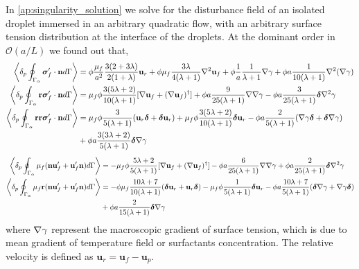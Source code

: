 In \ref{ap:singularity_solution} we solve for the disturbance field of an isolated droplet immersed in an arbitrary quadratic flow, with an arbitrary surface tension distribution at the interface of the droplets. 
At the dominant order in $\mathcal{O}(a/L)$ we found out that, 
\begin{align}
    \pSavg{\bm\sigma_f'\cdot \textbf{n}} &
    =
    \phi
    \frac{\mu_f}{a^2}
    \frac{3(2+3\lambda)}{2(1+\lambda)}\textbf{u}_r
    + \phi\mu_f  \frac{3\lambda}{4(\lambda +1)} \grad^2 \textbf{u}_f
    + \phi \frac{1}{a}\frac{1}{\lambda +1} \grad \gamma
    + \phi a \frac{1}{10(\lambda +1)}\grad^2(\grad\gamma)
    \label{eq:drag_forces}
    \\
    \pSavg{\textbf{r}\bm\sigma_f'\cdot \textbf{n}} &
    = \mu_f \phi 
    \frac{3(5\lambda +2)}{10(\lambda +1)}[\grad \textbf{u}_f+ (\grad \textbf{u}_f)^\dagger]
    + \phi a \frac{9}{25(\lambda +1)}\grad\grad \gamma
    - \phi a \frac{3}{25(\lambda +1)}\bm\delta\grad^2 \gamma
    \\
    \pSavg{\textbf{rr}\bm\sigma_f'\cdot \textbf{n}} &
    =
    \mu_f \phi \frac{3}{5(\lambda +1)} (\textbf{u}_r \bm\delta + \bm\delta \textbf{u}_r)
    + \mu_f \phi \frac{3(5\lambda +2)}{10(\lambda+1)}\bm\delta \textbf{u}_r
    - \phi a \frac{2}{5(\lambda +1)} (\grad \gamma \bm\delta + \bm\delta \grad \gamma)\nonumber \\
    &+ \phi a\frac{3(3\lambda +2)}{5(\lambda+1)}\bm\delta \grad \gamma
    \label{eq:second_moment_surf}
\end{align}
\begin{align}
    \pSavg{\mu_f (\textbf{n} \textbf{u}_f' + \textbf{u}_f' \textbf{n})}
    &=
    - \mu_f \phi \frac{5\lambda +2}{5(\lambda+1)}
    [\grad \textbf{u}_f+ (\grad \textbf{u}_f)^\dagger]
    - \phi a  \frac{6}{25(\lambda+1)} \grad\grad \gamma
    + \phi a \frac{2}{25(\lambda+1)} \bm\delta\grad^2 \gamma\\
    \pSavg{\mu_f \textbf{r}(\textbf{n} \textbf{u}_f' + \textbf{u}_f' \textbf{n})}
    &=
    -\phi\mu_f \frac{10\lambda +7}{10(\lambda+1)}
    (\bm\delta \textbf{u}_r + \textbf{u}_r \bm\delta)
    -\mu_f \phi  \frac{1}{5(\lambda+1)}\bm\delta \textbf{u}_r
    -\phi a \frac{10\lambda +7}{5(\lambda+1)} (\bm\delta \grad \gamma + \grad \gamma \bm\delta)\nonumber\\
    &+\phi a \frac{2}{15(\lambda+1)} \bm\delta \grad \gamma
    \label{eq:secondUN}
\end{align}
where $\mathbf{\nabla} \gamma$ represent the macroscopic gradient of surface tension, which is due to mean gradient of temperature field or surfactants concentration.
The relative velocity is defined as $ \textbf{u}_r = \textbf{u}_f - \textbf{u}_p$. 


